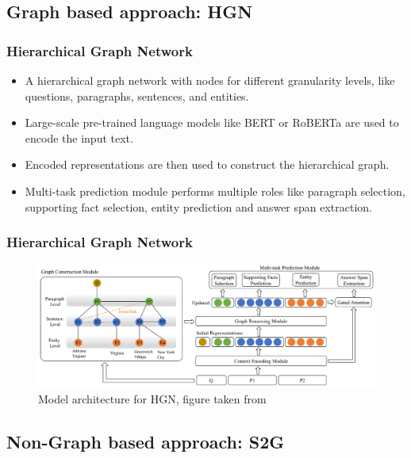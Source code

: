 \documentclass[10pt]{beamer}
\begin{document}
\subsection{Graph based approach: HGN}

\begin{frame}
  \frametitle{Hierarchical Graph Network}
  \begin{itemize}
    \item A hierarchical graph network with nodes for different granularity levels, like questions, paragraphs, sentences, and entities. %
    \item Large-scale pre-trained language models like BERT or RoBERTa are used to encode the input text. %
    \item Encoded representations are then used to construct the hierarchical graph. %
    \item Multi-task prediction module performs multiple roles like paragraph selection, supporting fact selection, entity prediction and answer span extraction.
  \end{itemize}

\end{frame}

\begin{frame}
  \frametitle{Hierarchical Graph Network}

  \begin{figure}[t] %
    \centering
    \includegraphics[width=\linewidth]{fig/ext_fig/hgn_diagram.png} %
    \caption{Model architecture for HGN, figure taken from \cite{RN119}}
    \label{fig:sample_hotpotqa} %
  \end{figure}

\end{frame}

\subsection{Non-Graph based approach: S2G}
\end{document}
